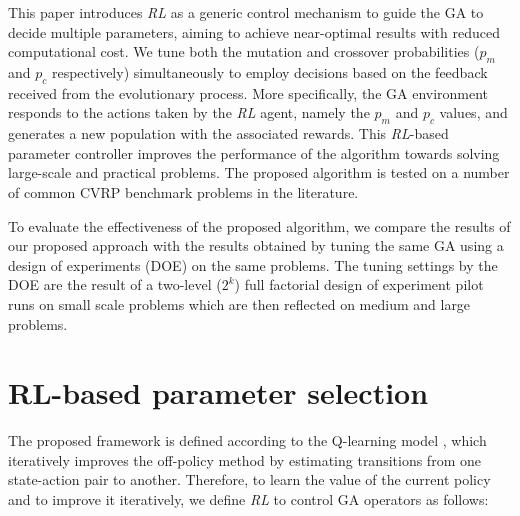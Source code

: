 \documentclass[acmsmall]{acmart}
\newcommand{\RL}{$RL$}
\begin{document}
This paper introduces \textit{RL} as a generic control mechanism to guide the GA to decide multiple parameters, aiming to achieve near-optimal results with reduced computational cost. We tune both the mutation and crossover probabilities ($p_m$ and $p_c$ respectively) simultaneously to employ decisions based on the feedback received from the evolutionary process. More specifically, the GA environment responds to the actions taken by the \textit{RL} agent, namely the $p_m$ and $p_c$ values, and generates a new population with the associated rewards. This \textit{RL}-based parameter controller improves the performance of the algorithm towards solving large-scale and practical problems. The proposed algorithm is tested on a number of common CVRP benchmark problems in the literature.

 To evaluate the effectiveness of the proposed algorithm, we compare the results of our proposed approach with the results obtained by tuning the same GA using a design of experiments (DOE) on the same problems. The tuning settings by the DOE are the result of a two-level ($2^k$) full factorial design of experiment \cite{montgomery2017design} pilot runs on small scale problems which are then reflected on medium and large problems.

\section{RL-based parameter selection} \label{sec:\RL}
The proposed framework is defined according to the Q-learning model \cite{watkins1989learning, watkins1992q, montague1999reinforcement}, which iteratively improves the off-policy method by estimating transitions from one state-action pair to another. Therefore, to learn the value of the current policy and to improve it iteratively, we define \textit{RL} to control GA operators as follows:
\end{document}
